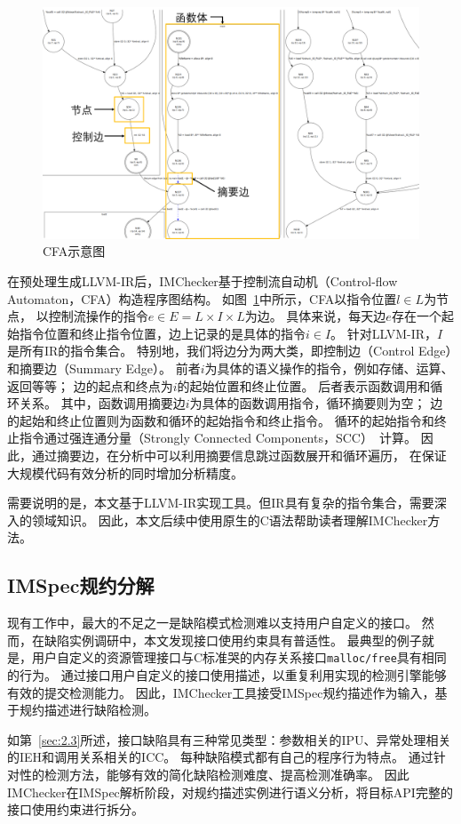 \begin{figure}[t]
	\centering
	\includegraphics[width=0.7\linewidth]{figures/cp3-3-cfa.png}
	\caption{
		CFA示意图
	}
	\label{fig:3-3-cfa}
\end{figure}

在预处理生成LLVM-IR后，IMChecker基于控制流自动机（Control-flow Automaton，CFA）构造程序图结构。
如图~\ref{fig:3-3-cfa}中所示，CFA以指令位置$l \in L$为节点，
以控制流操作的指令$e \in E = L \times I \times L$为边。
具体来说，每天边$e$存在一个起始指令位置和终止指令位置，边上记录的是具体的指令$i \in I$。
针对LLVM-IR，$I$是所有IR的指令集合。
特别地，我们将边分为两大类，即控制边（Control Edge）和摘要边（Summary Edge）。
前者$i$为具体的语义操作的指令，例如存储、运算、返回等等；
边的起点和终点为$i$的起始位置和终止位置。
后者表示函数调用和循环关系。
其中，函数调用摘要边$i$为具体的函数调用指令，循环摘要则为空；
边的起始和终止位置则为函数和循环的起始指令和终止指令。
循环的起始指令和终止指令通过强连通分量（Strongly Connected Components，SCC）~\cite{12-ele-scc}计算。
因此，通过摘要边，在分析中可以利用摘要信息跳过函数展开和循环遍历，
在保证大规模代码有效分析的同时增加分析精度。


需要说明的是，本文基于LLVM-IR实现工具。但IR具有复杂的指令集合，需要深入的领域知识。
因此，本文后续中使用原生的C语法帮助读者理解IMChecker方法。

\subsection{IMSpec规约分解}
现有工作中，最大的不足之一是缺陷模式检测难以支持用户自定义的接口。
然而，在缺陷实例调研中，本文发现接口使用约束具有普适性。
最典型的例子就是，用户自定义的资源管理接口与C标准哭的内存关系接口\texttt{malloc/free}具有相同的行为。
通过接口用户自定义的接口使用描述，以重复利用实现的检测引擎能够有效的提交检测能力。
因此，IMChecker工具接受IMSpec规约描述作为输入，基于规约描述进行缺陷检测。

如第~\ref{sec:2.3}所述，接口缺陷具有三种常见类型：参数相关的IPU、异常处理相关的IEH和调用关系相关的ICC。
每种缺陷模式都有自己的程序行为特点。
通过针对性的检测方法，能够有效的简化缺陷检测难度、提高检测准确率。
因此IMChecker在IMSpec解析阶段，对规约描述实例进行语义分析，将目标API完整的接口使用约束进行拆分。

